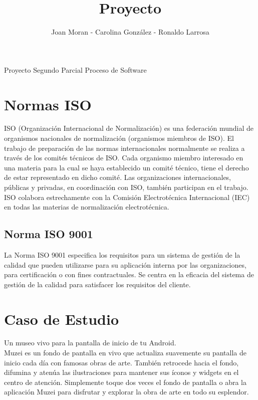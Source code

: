 \documentclass[12pt,a4paper]{article}
\author{Joan Moran - Carolina González - Ronaldo Larrosa}
\title{Proyecto}
\begin{document}
\maketitle Proyecto Segundo Parcial Proceso de Software 
\newpage
\tableofcontents
\newpage

\section{Normas ISO}

ISO (Organización Internacional de Normalización) es una federación mundial de organismos nacionales de normalización (organismos miembros de ISO). El trabajo de preparación de las normas internacionales normalmente se realiza a través de los comités técnicos de ISO. Cada organismo miembro interesado en una materia para la cual se haya establecido un comité técnico, tiene el derecho de estar representado en dicho comité. Las organizaciones internacionales, públicas y privadas, en coordinación con ISO, también participan en el trabajo. ISO colabora estrechamente con la Comisión Electrotécnica Internacional (IEC) en todas las materias de normalización electrotécnica.\\
\subsection{Norma ISO 9001}


La Norma ISO 9001 especifica los requisitos para un sistema de gestión de la calidad que pueden utilizarse para su aplicación interna por las organizaciones, para certificación o con fines contractuales. Se centra en la eficacia del sistema de gestión de la calidad para satisfacer los requisitos del cliente.\\

\section{Caso de Estudio}
Un museo vivo para la pantalla de inicio de tu Android.\\
Muzei es un fondo de pantalla en vivo que actualiza suavemente su pantalla de inicio cada día con famosas obras de arte. También retrocede hacia el fondo, difumina y atenúa las ilustraciones para mantener sus íconos y widgets en el centro de atención. Simplemente toque dos veces el fondo de pantalla o abra la aplicación Muzei para disfrutar y explorar la obra de arte en todo su esplendor.\\
\end{document}
